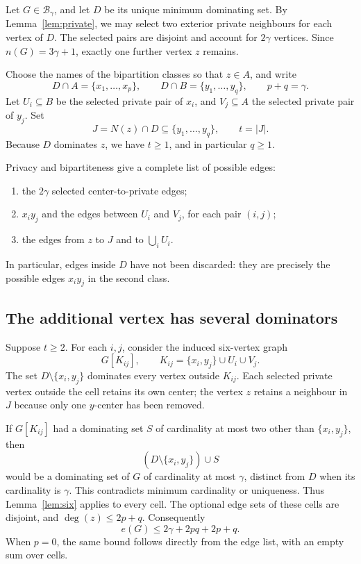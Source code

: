 \documentclass[11pt]{article}
\theoremstyle{definition}
\theoremstyle{remark}
\newcommand{\e}{e}
\begin{document}
Let $G\in\mathcal B_\gamma$, and let $D$ be its unique minimum dominating set.
By Lemma~\ref{lem:private}, we may select two exterior private neighbours for
each vertex of $D$. The selected pairs are disjoint and account for $2\gamma$
vertices. Since $n(G)=3\gamma+1$, exactly one further vertex $z$ remains.

Choose the names of the bipartition classes so that $z\in A$, and write
\[
 D\cap A=\{x_1,\ldots,x_p\},\qquad
 D\cap B=\{y_1,\ldots,y_q\},\qquad p+q=\gamma.
\]
Let $U_i\subseteq B$ be the selected private pair of $x_i$, and
$V_j\subseteq A$ the selected private pair of $y_j$. Set
\[
 J=N(z)\cap D\subseteq\{y_1,\ldots,y_q\},\qquad t=|J|.
\]
Because $D$ dominates $z$, we have $t\ge1$, and in particular $q\ge1$.

Privacy and bipartiteness give a complete list of possible edges:
\begin{enumerate}
\item the $2\gamma$ selected center-to-private edges;
\item $x_iy_j$ and the edges between $U_i$ and $V_j$, for each pair $(i,j)$;
\item the edges from $z$ to $J$ and to $\bigcup_iU_i$.
\end{enumerate}
In particular, edges inside $D$ have not been discarded: they are precisely
the possible edges $x_iy_j$ in the second class.

\subsection{The additional vertex has several dominators}

Suppose $t\ge2$. For each $i,j$, consider the induced six-vertex graph
\[
 G[K_{ij}],\qquad K_{ij}=\{x_i,y_j\}\cup U_i\cup V_j.
\]
The set $D\setminus\{x_i,y_j\}$ dominates every vertex outside $K_{ij}$.
Each selected private vertex outside the cell retains its own center;
the vertex $z$ retains a neighbour in $J$ because only one $y$-center has
been removed.

If $G[K_{ij}]$ had a dominating set $S$ of cardinality at most two other
than $\{x_i,y_j\}$, then
\[
 (D\setminus\{x_i,y_j\})\cup S
\]
would be a dominating set of $G$ of cardinality at most $\gamma$, distinct
from $D$ when its cardinality is $\gamma$. This contradicts minimum
cardinality or uniqueness. Thus Lemma~\ref{lem:six} applies to every cell.
The optional edge sets of these cells are disjoint, and
$\deg(z)\le2p+q$. Consequently
\begin{equation}\label{eq:multiple}
 \e(G)\le 2\gamma+2pq+2p+q.
\end{equation}
When $p=0$, the same bound follows directly from the edge list, with an
empty sum over cells.
\end{document}
